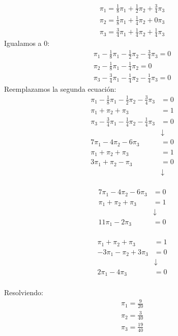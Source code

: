 \documentclass{templateNote}
\begin{document}
\begin{align*}
    \pi_1 = \frac{1}{8} \pi_1 + \frac{1}{2} \pi_2 + \frac{3}{4} \pi_3\\
    \pi_2 = \frac{1}{8} \pi_1 + \frac{1}{4} \pi_2 + 0 \pi_3\\
    \pi_3 = \frac{3}{4} \pi_1 + \frac{1}{4} \pi_2 + \frac{1}{4} \pi_3
\end{align*}
Igualamos a 0:
\begin{align*}
    \pi_1 - \frac{1}{8} \pi_1 - \frac{1}{2} \pi_2 - \frac{3}{4} \pi_3 = 0\\
    \pi_2 - \frac{1}{8} \pi_1 - \frac{1}{4} \pi_2 = 0\\
    \pi_3 - \frac{3}{4} \pi_1 - \frac{1}{4} \pi_2 - \frac{1}{4} \pi_3 = 0
\end{align*}
Reemplazamos la segunda ecuación:
\begin{align*}
    \pi_1 - \frac{1}{8} \pi_1 - \frac{1}{2} \pi_2 - \frac{3}{4} \pi_3 &= 0\\
    \pi_1 + \pi_2 + \pi_3 &= 1\\
    \pi_3 - \frac{3}{4} \pi_1 - \frac{1}{4} \pi_2 - \frac{1}{4} \pi_3 &= 0\\
    \phantom{\pi_1 + \pi_2 + \pi_3} &\downarrow\\
    7\pi_1 - 4\pi_2 - 6\pi_3 &= 0\\
    \pi_1 + \pi_2 + \pi_3 &= 1\\
    3\pi_1 + \pi_2 - \pi_3 &= 0\\
    \phantom{\pi_1 + \pi_2 + \pi_3} &\downarrow\\
\end{align*}

\begin{minipage}{0.45\textwidth}
    \begin{align*}
        7\pi_1 - 4\pi_2 - 6\pi_3 &= 0\\
        \pi_1 + \pi_2 + \pi_3 &= 1\\
        \phantom{\pi_1 + \pi_2 + \pi_3} &\downarrow\\
        11\pi_1 - 2\pi_3 &= 0\\
    \end{align*}
\end{minipage}
\hfill
\begin{minipage}{0.45\textwidth}
    \begin{align*}
        \pi_1 + \pi_2 + \pi_3 &= 1\\
        -3\pi_1 - \pi_2 + 3\pi_3 &= 0\\
        \phantom{\pi_1 + \pi_2 + \pi_3} &\downarrow\\
        2\pi_1 - 4\pi_3 &= 0\\
    \end{align*}
\end{minipage}
Resolviendo:
\begin{align*}
    \pi_1 = \frac{9}{20}\\
    \pi_2 = \frac{3}{40}\\
    \pi_3 = \frac{19}{40}
\end{align*}
\end{document}
